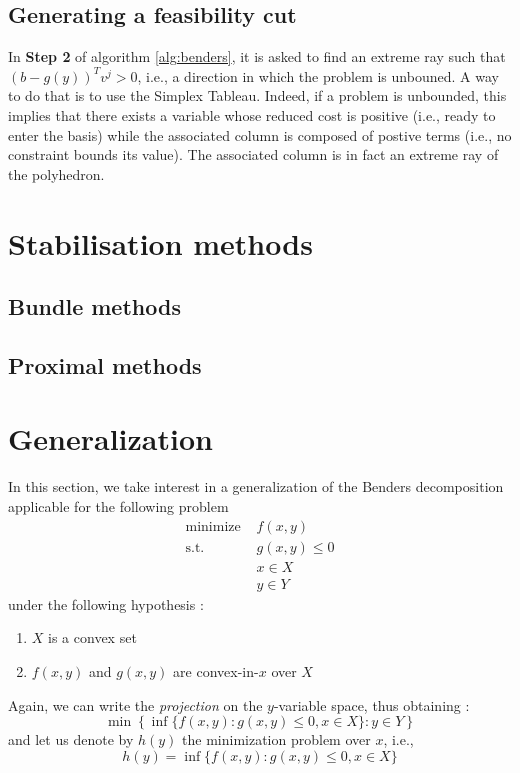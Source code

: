 \subsection{Generating a feasibility cut}

In \textbf{Step 2} of algorithm \ref{alg:benders}, it is asked to find an extreme ray such that $(b-g(y))^Tv^j > 0$, i.e., a direction in which the problem is unbouned. A way to do that is to use the Simplex Tableau. Indeed, if a problem is unbounded, this implies that there exists a variable whose reduced cost is positive (i.e., ready to enter the basis) while the associated column is composed of postive terms (i.e., no constraint bounds its value). The associated column is in fact an extreme ray of the polyhedron. 

\section{Stabilisation methods}

\subsection{Bundle methods}

\subsection{Proximal methods}

\section{Generalization}

In this section, we take interest in a generalization of the Benders decomposition applicable for the following problem
\begin{align}
    \textrm{minimize } & f(x,y) \\
    \textrm{s.t. } & g(x,y) \le 0\\
    & x\in X\\
    & y\in Y
\end{align} under the following hypothesis :
\begin{enumerate}[label=($\roman*$)]
    \item $X$ is a convex set
    \item $f(x,y)$ and $g(x,y)$ are convex-in-$x$ over $X$
\end{enumerate}

Again, we can write the \textit{projection} on the $y$-variable space, thus obtaining : 
\[
    \min\left\{ \inf\{ f(x,y) : g(x,y)\le 0, x\in X \} : y \in Y \right\}
\] and let us denote by $h(y)$ the minimization problem over $x$, i.e., 
\[
    h(y) = \inf\{ f(x,y) : g(x,y)\le 0, x\in X \}
\]